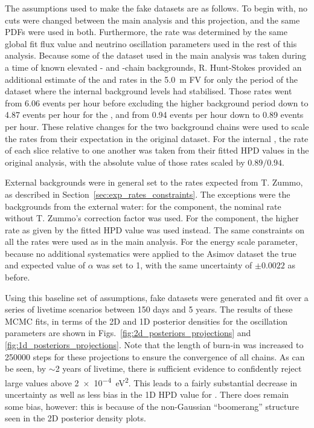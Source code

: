The assumptions used to make the fake datasets are as follows. To begin with, no cuts were changed between the main analysis and this projection, and the same PDFs were used in both. Furthermore, the \beight{} rate was determined by the same global fit flux value and neutrino oscillation parameters used in the rest of this analysis. Because some of the dataset used in the main analysis was taken during a time of known elevated - and -chain backgrounds, R. Hunt-Stokes provided an additional estimate of the  and  rates in the \SI{5.0}{\metre} FV for only the period of the dataset where the internal background levels had stabilised. Those rates went from 6.06 events per hour before excluding the higher background period down to 4.87 events per hour for the , and from 0.94 events per hour down to 0.89 events per hour. These relative changes for the two background chains were used to scale the rates from their expectation in the original dataset. For the internal , the rate of each slice relative to one another was taken from their fitted HPD values in the original analysis, with the absolute value of those rates scaled by $0.89/0.94$.

External backgrounds were in general set to the rates expected from T. Zummo, as described in Section~\ref{sec:exp_rates_constraints}. The exceptions were the backgrounds from the external water: for the  component, the nominal rate without T. Zummo's correction factor was used. For the  component, the higher rate as given by the fitted HPD value was used instead. The same constraints on all the rates were used as in the main analysis. For the energy scale parameter, because no additional systematics were applied to the Asimov dataset the true and expected value of $\alpha$ was set to 1, with the same uncertainty of $\pm0.0022$ as before.

Using this baseline set of assumptions, fake datasets were generated and fit over a series of livetime scenarios between 150 days and 5 years. The results of these MCMC fits, in terms of the 2D and 1D posterior densities for the oscillation parameters are shown in Figs.~\ref{fig:2d_posteriors_projections} and \ref{fig:1d_posteriors_projections}. Note that the length of burn-in was increased to \num{250000} steps for these projections to ensure the convergence of all chains. As can be seen, by $\sim$2 years of livetime, there is sufficient evidence to confidently reject large \dmsq{} values above \SI{2e-4}{\eV\squared}. This leads to a fairly substantial decrease in uncertainty as well as less bias in the 1D HPD value for \tonetwo{}. There does remain some bias, however: this is because of the non-Gaussian ``boomerang'' structure seen in the 2D posterior density plots.

